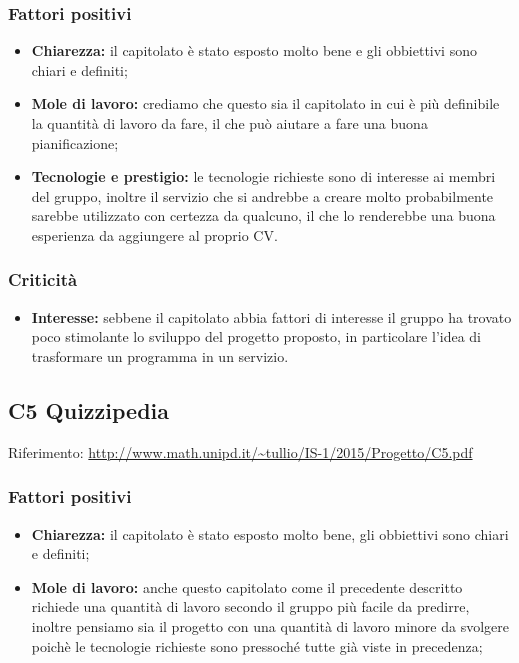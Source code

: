 \documentclass{scalatekids-article}
\begin{document}
\subsubsection{Fattori positivi}
\begin{itemize}
  \item \textbf{Chiarezza:} il capitolato è stato esposto molto bene e gli obbiettivi sono chiari e definiti;
  \item \textbf{Mole di lavoro:} crediamo che questo sia il capitolato in cui è più definibile la quantità di lavoro da fare, il che può aiutare a fare una buona pianificazione;
  \item \textbf{Tecnologie e prestigio:} le tecnologie richieste sono di interesse ai membri del gruppo, inoltre il servizio che si andrebbe a creare molto probabilmente sarebbe utilizzato con certezza da qualcuno, il che lo renderebbe una buona esperienza da aggiungere al proprio CV.
\end{itemize}
\subsubsection{Criticità}
\begin{itemize}
  \item \textbf{Interesse:} sebbene il capitolato abbia fattori di interesse il gruppo ha trovato poco stimolante lo sviluppo del progetto proposto, in particolare l'idea di trasformare un programma in un servizio.
\end{itemize}

\subsection{C5 Quizzipedia}
Riferimento: \url{http://www.math.unipd.it/~tullio/IS-1/2015/Progetto/C5.pdf}\\
\subsubsection{Fattori positivi}
\begin{itemize}
  \item \textbf{Chiarezza:} il capitolato è stato esposto molto bene, gli obbiettivi sono chiari e definiti;
  \item \textbf{Mole di lavoro:} anche questo capitolato come il precedente descritto richiede una quantità di lavoro secondo il gruppo più facile da predirre, inoltre pensiamo sia il progetto con una quantità di lavoro minore da svolgere poichè le tecnologie richieste sono pressoché tutte già viste in precedenza;
\end{itemize}
\end{document}
